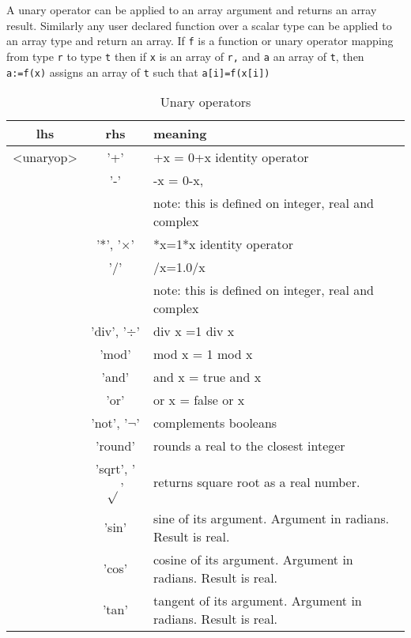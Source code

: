 {A unary operator can be applied to an array argument and returns
an array result. Similarly any user declared function over a scalar
type can be applied to an array type and return an array. If \texttt{f} is a
function or unary operator mapping from type \texttt{r} to type \texttt{t} then
if \texttt{x} is an array of \texttt{r,} and \texttt{a} an array of \texttt{t},
then \texttt{a:=f(x)} assigns an array of \texttt{t} such that \texttt{a{[}i{]}=f(x{[}i{]})}

\begin{table}
\caption{Unary operators}\label{tab:unops}
{\centering \begin{tabular}{|c|c||l|}
\hline 
{\small lhs }&
{\small rhs}&
{\small meaning}\\
\hline 
{\small <unaryop>}&
{\small '+'}&
{\small +x = 0+x identity operator}\\
{\small }&
{\small '-'}&
{\small -x = 0-x, }\\
&
&
{\small note: this is defined on integer, real and complex}\\
{\small }&
{\small '{*}', '$\times$'}&
{\small {*}x=1{*}x identity operator}\\
{\small }&
{\small '/'}&
{\small /x=1.0/x }\\
&
&
{\small note: this is defined on integer, real and complex}\\
{\small }&
{\small 'div', '$\div $'}&
{\small div x =1 div x}\\
{\small }&
{\small 'mod'}&
{\small mod x = 1 mod x}\\
{\small }&
{\small 'and'%
}&
{\small and x = true and x}\\
{\small }&
{\small 'or'%
}&
{\small or x = false or x}\\
{\small }&
{\small 'not', '$\neg$'}&
{\small complements booleans}\\
{\small }&
{\small 'round'}&
{\small rounds a real to the closest integer}\\
{\small }&
{\small 'sqrt', '$\sqrt{} $'} &
{\small returns square root as a real\index{real} number.}\\
{\small }&
{\small 'sin'}&
{\small sine of its argument. Argument in radians. Result is real.}\\
{\small }&
{\small 'cos'}&
{\small cosine of its argument. Argument in radians. Result is real.}\\
{\small }&
{\small 'tan'}&
{\small tangent of its argument. Argument in radians. Result is real.}\\

\end{tabular}}
\end{table}}
